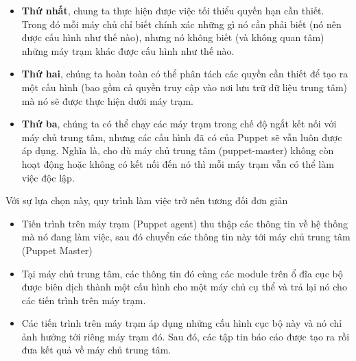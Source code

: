 \begin{itemize}
\item \textbf{Thứ nhất}, chung ta thực hiện được việc tối thiểu quyền hạn cần thiết. Trong đó mỗi máy chủ chỉ biết chính xác những gì nó cần phải biết (nó nên được cấu hình như thế nào), nhưng nó không biết (và không quan tâm) những máy trạm khác được cấu hình như thế nào.

\item \textbf{Thứ hai}, chúng ta hoàn toàn có thể phân tách các quyền cần thiết để tạo ra một cấu hình (bao gồm cả quyền truy cập vào nơi lưu trữ dữ liệu trung tâm) mà nó sẽ được thực hiện dưới máy trạm.

\item \textbf{Thứ ba}, chúng ta có thể chạy các máy trạm trong chế độ ngắt kết nối với máy chủ trung tâm, nhưng các cấu hình đã có của Puppet sẽ vẫn luôn được áp dụng. Nghĩa là, cho dù máy chủ trung tâm (puppet-master) không còn hoạt động hoặc không có kết nối đến nó thì mỗi máy trạm vẫn có thể làm việc độc lập.

\end{itemize}

Với sự lựa chọn này, quy trình làm việc trở nên tương đối đơn giản

\begin{itemize}
\item Tiến trình trên máy trạm (Puppet agent) thu thập các thông tin về hệ thống mà nó đang làm việc, sau đó chuyển các thông tin này tới máy chủ trung tâm (Puppet Master)

\item Tại máy chủ trung tâm, các thông tin đó cùng các module trên ổ đĩa cục bộ được biên dịch thành một cấu hình cho một máy chủ cụ thể và trả lại nó cho các tiến trình trên máy trạm.

\item Các tiến trình trên máy trạm áp dụng những cấu hình cục bộ này và nó chỉ ảnh hưởng tới riêng máy trạm đó. Sau đó, các tập tin báo cáo được tạo ra rồi đưa kết quả về máy chủ trung tâm.
\end{itemize}

